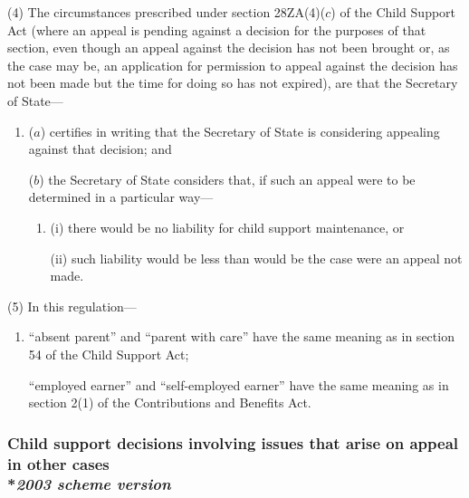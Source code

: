 \documentclass[12pt,a4paper]{article}
\begin{document}
(4) The circumstances prescribed under section 28ZA(4)($c$) of the Child Support Act (where an appeal is pending against a decision for the purposes of that section, even though an appeal against the decision has not been brought or, as the case may be, an application for 
permission  %
to appeal against the decision has not been made but the time for doing so has not expired), are that the Secretary of State—
\begin{enumerate}\item[]
($a$) certifies in writing that 
the Secretary of State  %
is considering appealing against that decision; and

($b$) 
the Secretary of State  %
considers that, if such an appeal were to be determined in a particular way—
\begin{enumerate}\item[]
(i) there would be no liability for child support maintenance, or

(ii) such liability would be less than would be the case were an appeal not made.
\end{enumerate}
\end{enumerate}

(5) In this regulation—
\begin{enumerate}\item[]
“absent parent” and “parent with care” have the same meaning as in section 54 of the Child Support Act;

“employed earner” and “self-employed earner” have the same meaning as in section 2(1) of the Contributions and Benefits Act.
\end{enumerate}


\subsubsection[23. Child support decisions involving issues that arise on appeal in other cases --- \emph{2003 scheme version}]{Child support decisions involving issues that arise on appeal in other cases\\*\emph{2003 scheme version}}
\end{document}
